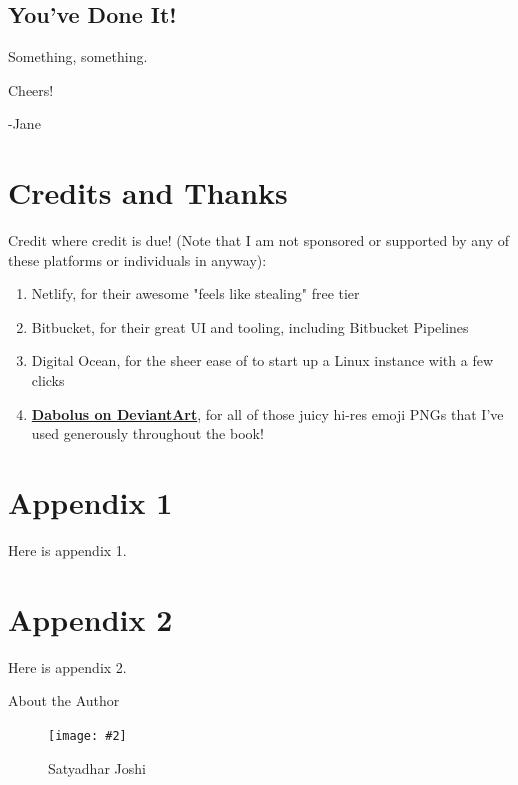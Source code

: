 \documentclass[a4paper,headinclude=on,footinclude=on,12pt,oneside]{scrbook}
\newcommand{\link}[2]{\textbf{\textcolor{monokaiPink}{\href{#2}{#1}}}}
\newcommand{\standardfigure}[3]{\begin{figure}[H]\begin{center}\texttt{[image: \#2]}\caption{#3}\label{fig:#2}\end{center}\end{figure}}
\begin{document}
\section*{You've Done It!}

Something, something.

Cheers! \beers

-Jane

\chapter*{Credits and Thanks}

Credit where credit is due! (Note that I am not sponsored or supported by any of these platforms or individuals in anyway):

\begin{enumerate}
\item Netlify, for their awesome "feels like stealing" free tier
\item Bitbucket, for their great UI and tooling, including Bitbucket Pipelines
\item Digital Ocean, for the sheer ease of to start up a Linux instance with a few clicks
\item \link{Dabolus on DeviantArt}{https://www.deviantart.com/dabolus}, for all of those juicy hi-res emoji PNGs that I've used generously throughout the book!
\end{enumerate}

\begin{appendices}

\chapter{Appendix 1}

Here is appendix 1.

\chapter{Appendix 2}

Here is appendix 2.

\end{appendices}

\printindex
{}


About the Author

\standardfigure{\textwidth/2}{about/author_joshi}{Satyadhar Joshi}
\end{document}
